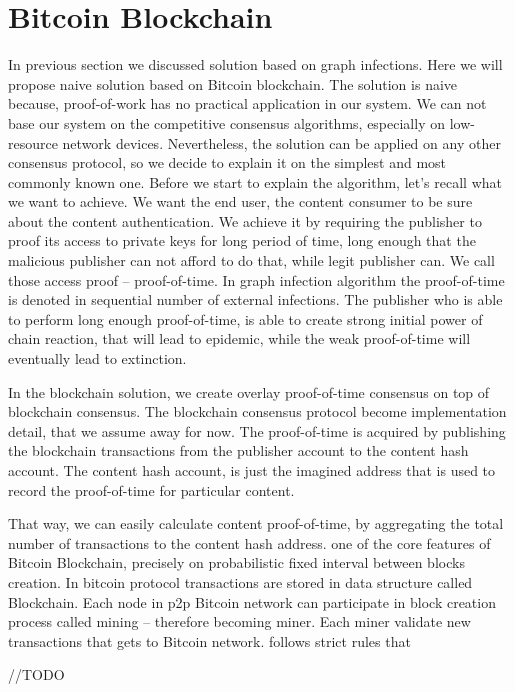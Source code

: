 \documentclass[nostrict]{szablonPG}
\begin{document}
\section{Bitcoin Blockchain}
In previous section we discussed solution based on graph infections. Here we will propose naive solution based on Bitcoin blockchain. The solution is naive because, proof-of-work has no practical application in our system. We can not base our system on the competitive consensus algorithms, especially on low-resource network devices. Nevertheless, the solution can be applied on any other consensus protocol, so we decide to explain it on the simplest and most commonly known one. 
Before we start to explain the algorithm, let's recall what we want to achieve. We want the end user, the content consumer to be sure about the content authentication. We achieve it by requiring the publisher to proof its access to private keys for long period of time, long enough that the malicious publisher can not afford to do that, while legit publisher can. We call those access proof -- proof-of-time. In graph infection algorithm the proof-of-time is denoted in sequential number of external infections. The publisher who is able to perform long enough proof-of-time, is able to create strong initial power of chain reaction, that will lead to epidemic, while the weak proof-of-time will eventually lead to extinction. 

In the blockchain solution, we create overlay proof-of-time consensus on top of blockchain consensus. The blockchain consensus protocol become implementation detail, that we assume away for now. The proof-of-time is acquired by publishing the blockchain transactions from the publisher account to the content hash account. The content hash account, is just the imagined address that is used to record the proof-of-time for particular content. 

That way, we can easily calculate content proof-of-time, by aggregating the total number of transactions to the content hash address.
one of the core features of Bitcoin Blockchain, precisely on probabilistic fixed interval between blocks creation. In bitcoin protocol transactions are stored in data structure called Blockchain. Each node in p2p Bitcoin network can participate in block creation process called mining -- therefore becoming miner. Each miner validate new transactions that gets to Bitcoin network. follows strict rules that 

//TODO
\end{document}
